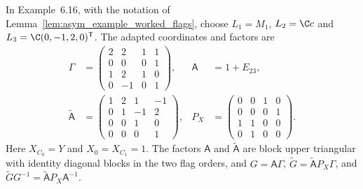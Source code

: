 \begin{lemma}
    \label{lem:asym_example_worked_factorization}
    \leanok
    In Example~6.16, with the notation of Lemma~\ref{lem:asym_example_worked_flags}, choose
    $L_1=M_1$, $L_2=\C c$ and $L_3=\C(0,-1,2,0)^{\mathsf T}$.
    The adapted coordinates and factors are
    \begin{align}
        \Gamma                & =\begin{pmatrix}
                                     2 & 2  & 1 & 1 \\
                                     0 & 0  & 0 & 1 \\
                                     1 & 2  & 1 & 0 \\
                                     0 & -1 & 0 & 1
                                 \end{pmatrix},  &
        \mathsf A             & =1+E_{23},         \\
        \widetilde{\mathsf A} & =\begin{pmatrix}
                                     1 & 2 & 1  & -1 \\
                                     0 & 1 & -1 & 2  \\
                                     0 & 0 & 1  & 0  \\
                                     0 & 0 & 0  & 1
                                 \end{pmatrix}, &
        P_X                   & =\begin{pmatrix}
                                     0 & 0 & 1 & 0 \\
                                     0 & 0 & 0 & 1 \\
                                     1 & 1 & 0 & 0 \\
                                     0 & 1 & 0 & 0
                                 \end{pmatrix}.
    \end{align}
    Here $X_{C_0}=Y$ and $X_0=X_{C_1}=1$. The factors $\mathsf A$ and
    $\widetilde{\mathsf A}$ are block upper triangular with identity diagonal
    blocks in the two flag orders, and
    $G=\mathsf A\Gamma$,
    $\widetilde G=\widetilde{\mathsf A}P_X\Gamma$, and
    $\widetilde GG^{-1}=\widetilde{\mathsf A}P_X\mathsf A^{-1}$.
\end{lemma}


